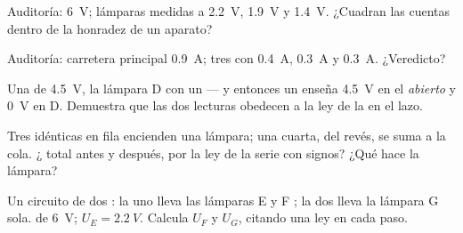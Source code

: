 \begin{exercise}[$\star$]\label{exo:g8:circuit-laws:7}
Auditoría:  \qty{6}{V}; lámparas  medidas a
\qty{2.2}{V}, \qty{1.9}{V} y \qty{1.4}{V}. ¿Cuadran las cuentas dentro
de la honradez de un aparato?
\end{exercise}

\begin{exercise}[$\star$]\label{exo:g8:circuit-laws:8}
Auditoría: carretera principal \qty{0.9}{A}; tres  con
\qty{0.4}{A}, \qty{0.3}{A} y \qty{0.3}{A}. ¿Veredicto?
\end{exercise}

\begin{exercise}[$\star\star$]\label{exo:g8:circuit-laws:9}
Una  de \qty{4.5}{V}, la lámpara D  con un
 --- y entonces un  enseña
\qty{4.5}{V} en el \emph{ abierto} y \qty{0}{V} en D.
Demuestra que las dos lecturas obedecen a la ley de la
 en el lazo.
\end{exercise}

\begin{exercise}[$\star\star$]\label{exo:g8:circuit-laws:10}
Tres  idénticas en fila encienden una lámpara; una cuarta,
del revés, se suma a la cola. ¿ total antes y después,
por la ley de la serie con signos? ¿Qué hace la lámpara?
\end{exercise}

\begin{exercise}[$\star\star$]\label{exo:g8:circuit-laws:11}
Un circuito de dos : la  uno lleva las
lámparas E y F ; la  dos lleva la lámpara G
sola.  de \qty{6}{V}; $U_E = \qty{2.2}{V}$. Calcula $U_F$ y
$U_G$, citando una ley en cada paso.
\end{exercise}


